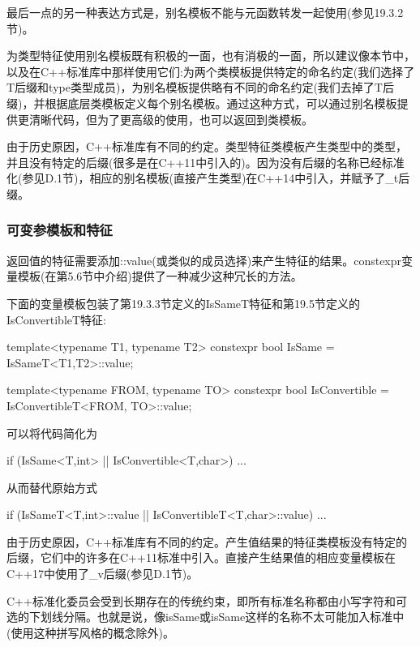 最后一点的另一种表达方式是，别名模板不能与元函数转发一起使用(参见19.3.2节)。

为类型特征使用别名模板既有积极的一面，也有消极的一面，所以建议像本节中，以及在C++标准库中那样使用它们:为两个类模板提供特定的命名约定(我们选择了T后缀和type类型成员)，为别名模板提供略有不同的命名约定(我们去掉了T后缀)，并根据底层类模板定义每个别名模板。通过这种方式，可以通过别名模板提供更清晰代码，但为了更高级的使用，也可以返回到类模板。

由于历史原因，C++标准库有不同的约定。类型特征类模板产生类型中的类型，并且没有特定的后缀(很多是在C++11中引入的)。因为没有后缀的名称已经标准化(参见D.1节)，相应的别名模板(直接产生类型)在C++14中引入，并赋予了\_t后缀。

\subsubsection{可变参模板和特征}

返回值的特征需要添加::value(或类似的成员选择)来产生特征的结果。constexpr变量模板(在第5.6节中介绍)提供了一种减少这种冗长的方法。

下面的变量模板包装了第19.3.3节定义的IsSameT特征和第19.5节定义的IsConvertibleT特征:

\begin{cpp}
template<typename T1, typename T2>
	constexpr bool IsSame = IsSameT<T1,T2>::value;
	
template<typename FROM, typename TO>
	constexpr bool IsConvertible = IsConvertibleT<FROM, TO>::value;
\end{cpp}

可以将代码简化为

\begin{cpp}
if (IsSame<T,int> || IsConvertible<T,char>) ...
\end{cpp}

从而替代原始方式

\begin{cpp}
if (IsSameT<T,int>::value || IsConvertibleT<T,char>::value) ...
\end{cpp}

由于历史原因，C++标准库有不同的约定。产生值结果的特征类模板没有特定的后缀，它们中的许多在C++11标准中引入。直接产生结果值的相应变量模板在C++17中使用了\_v后缀(参见D.1节)。

\begin{notice}C++标准化委员会受到长期存在的传统约束，即所有标准名称都由小写字符和可选的下划线分隔。也就是说，像isSame或isSame这样的名称不太可能加入标准中(使用这种拼写风格的概念除外)。
\end{notice}




